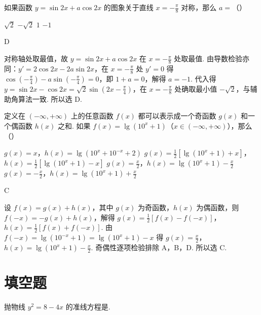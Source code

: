 \documentclass[UTF8,a4paper,oneside,11pt]{ctexbook}
\begin{document}
\begin{problem}
如果函数 \(y=\sin 2x+a\cos 2x\) 的图象关于直线 \(x=-\frac{\pi}{8}\) 对称，那么 \(a=\)（\quad）

\choices
    {\(\sqrt{2}\)}
    {\(-\sqrt{2}\)}
    {\(1\)}
    {\(-1\)}
\end{problem}

\begin{answer}
D
\end{answer}

\begin{solution}
对称轴处取最值，故 \(y=\sin 2x+a\cos 2x\) 在 \(x=-\frac{\pi}{8}\) 处取最值. 由导数检验亦同：\(y'=2\cos 2x-2a\sin 2x\)，在 \(x=-\frac{\pi}{8}\) 处 \(y'=0\) 得 \(\cos\left( -\frac{\pi}{4} \right)-a\sin\left( -\frac{\pi}{4} \right)=0\)，即 \(1+a=0\)，解得 \(a=-1\). 代入得 \(y=\sin 2x-\cos 2x=\sqrt{2}\sin\left( 2x-\frac{\pi}{4} \right)\)，在 \(x=-\frac{\pi}{8}\) 处确取最小值 \(-\sqrt{2}\)，与辅助角算法一致. 所以选 D.
\end{solution}

\begin{problem}
定义在 \((-\infty,+\infty)\) 上的任意函数 \(f(x)\) 都可以表示成一个奇函数 \(g(x)\) 和一个偶函数 \(h(x)\) 之和. 如果 \(f(x)=\lg(10^{x}+1)\)（\(x\in(-\infty,+\infty)\)），那么（\quad）

\choices
    {\(g(x)=x\)，\(h(x)=\lg(10^{x}+10^{-x}+2)\)}
    {\(g(x)=\frac{1}{2}[\lg(10^{x}+1)+x]\)，\(h(x)=\frac{1}{2}[\lg(10^{x}+1)-x]\)}
    {\(g(x)=\frac{x}{2}\)，\(h(x)=\lg(10^{x}+1)-\frac{x}{2}\)}
    {\(g(x)=-\frac{x}{2}\)，\(h(x)=\lg(10^{x}+1)+\frac{x}{2}\)}
\end{problem}

\begin{answer}
C
\end{answer}

\begin{solution}
设 \(f(x)=g(x)+h(x)\)，其中 \(g(x)\) 为奇函数，\(h(x)\) 为偶函数，则 \(f(-x)=-g(x)+h(x)\)，解得 \(g(x)=\frac{1}{2}[f(x)-f(-x)]\)，\(h(x)=\frac{1}{2}[f(x)+f(-x)]\). 由 \(f(-x)=\lg(10^{-x}+1)=\lg(10^{x}+1)-x\) 得 \(g(x)=\frac{x}{2}\)，\(h(x)=\lg(10^{x}+1)-\frac{x}{2}\). 奇偶性逐项检验排除 A，B，D. 所以选 C.
\end{solution}

\section{填空题}

\begin{problem}
抛物线 \(y^{2}=8-4x\) 的准线方程是\fillinblank{}.
\end{problem}
\end{document}

